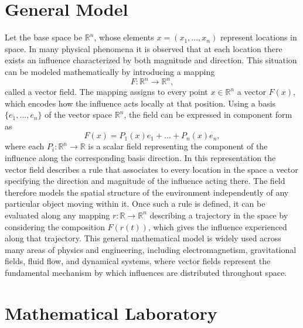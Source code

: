 \documentclass{article}
\begin{document}
    \section{General Model}
    
    Let the base space be $\mathbb{R}^n$, whose elements $x=(x_1,\dots,x_n)$ represent locations in space. In many physical phenomena it is observed that at each location there exists an influence characterized by both magnitude and direction. This situation can be modeled mathematically by introducing a mapping
    \[
    F:\mathbb{R}^n \to \mathbb{R}^n,
    \]
    called a vector field. The mapping assigns to every point $x\in\mathbb{R}^n$ a vector $F(x)$, which encodes how the influence acts locally at that position. Using a basis $\{e_1,\dots,e_n\}$ of the vector space $\mathbb{R}^n$, the field can be expressed in component form as
    \[
    F(x)=P_1(x)e_1+\dots+P_n(x)e_n,
    \]
    where each $P_i:\mathbb{R}^n\to\mathbb{R}$ is a scalar field representing the component of the influence along the corresponding basis direction. In this representation the vector field describes a rule that associates to every location in the space a vector specifying the direction and magnitude of the influence acting there. The field therefore models the spatial structure of the environment independently of any particular object moving within it. Once such a rule is defined, it can be evaluated along any mapping $r:\mathbb{R}\to\mathbb{R}^n$ describing a trajectory in the space by considering the composition $F(r(t))$, which gives the influence experienced along that trajectory. This general mathematical model is widely used across many areas of physics and engineering, including electromagnetism, gravitational fields, fluid flow, and dynamical systems, where vector fields represent the fundamental mechanism by which influences are distributed throughout space.
    
    \section{Mathematical Laboratory}
    
\end{document}
